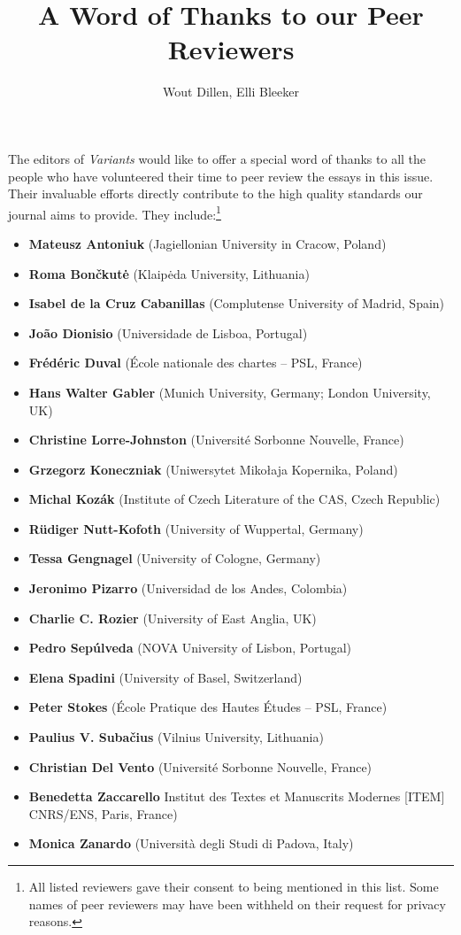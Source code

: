 \documentclass{article}
\author{Wout Dillen, Elli Bleeker}
\title{A Word of Thanks to our Peer Reviewers}
\begin{document}
\maketitle

\section*{}
The editors of \emph{Variants} would like to offer a special word of thanks to all the people who have volunteered their time to peer review the essays in this issue. Their invaluable efforts directly contribute to the high quality standards our journal aims to provide. They include:\footnote{All listed reviewers gave their consent to being mentioned in this list. Some names of peer reviewers may have been withheld on their request for privacy reasons.} 

\begin{itemize}
    \item \textbf{Mateusz Antoniuk} (Jagiellonian University in Cracow, Poland)
    \item \textbf{Roma Bončkutė} (Klaipėda University, Lithuania)
    \item \textbf{Isabel de la Cruz Cabanillas} (Complutense University of Madrid, Spain)
    \item \textbf{João Dionisio} (Universidade de Lisboa, Portugal)
    \item \textbf{Frédéric Duval} (École nationale des chartes -- PSL, France)
    \item \textbf{Hans Walter Gabler} (Munich University, Germany; London University, UK) 
    \item \textbf{Christine Lorre-Johnston} (Université Sorbonne Nouvelle, France)
    \item \textbf{Grzegorz Koneczniak} (Uniwersytet Mikołaja Kopernika, Poland)
    \item \textbf{Michal Kozák} (Institute of Czech Literature of the CAS, Czech Republic)
    \item \textbf{Rüdiger Nutt-Kofoth} (University of Wuppertal, Germany)
    \item \textbf{Tessa Gengnagel} (University of Cologne, Germany)
    \item \textbf{Jeronimo Pizarro} (Universidad de los Andes, Colombia)
    \item \textbf{Charlie C. Rozier} (University of East Anglia, UK)
    \item \textbf{Pedro Sepúlveda} (NOVA University of Lisbon, Portugal)
    \item \textbf{Elena Spadini} (University of Basel, Switzerland)
    \item \textbf{Peter Stokes} (École Pratique des Hautes Études -- PSL, France)
    \item \textbf{Paulius V. Subačius} (Vilnius University, Lithuania)
    \item \textbf{Christian Del Vento} (Université Sorbonne Nouvelle, France)
    \item \textbf{Benedetta Zaccarello} Institut des Textes et Manuscrits Modernes [ITEM] CNRS/ENS, Paris, France)
    \item \textbf{Monica Zanardo} (Università degli Studi di Padova, Italy)
\end{itemize}
\end{document}
